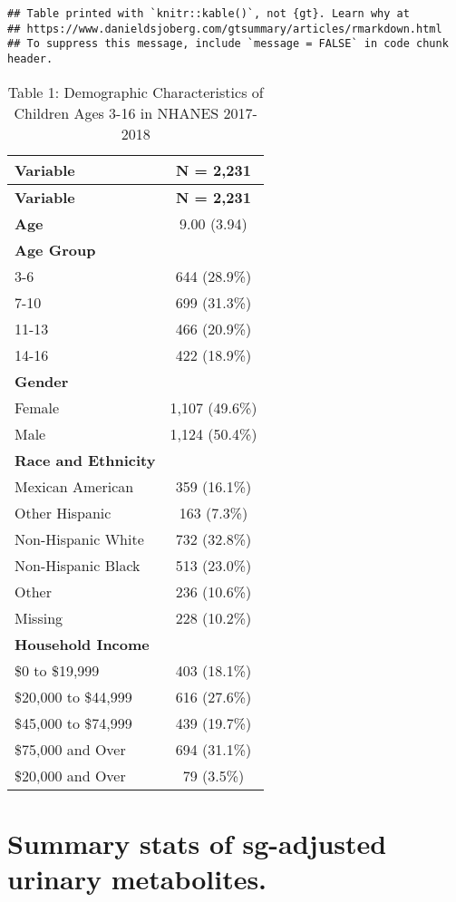 \documentclass[
]{article}
\begin{document}
\begin{verbatim}
## Table printed with `knitr::kable()`, not {gt}. Learn why at
## https://www.danieldsjoberg.com/gtsummary/articles/rmarkdown.html
## To suppress this message, include `message = FALSE` in code chunk header.
\end{verbatim}

\begin{longtable}[]{@{}lc@{}}
\caption{Table 1: Demographic Characteristics of Children Ages 3-16 in
NHANES 2017-2018}\tabularnewline
\toprule\noalign{}
\textbf{Variable} & \textbf{N = 2,231} \\
\midrule\noalign{}
\endfirsthead
\toprule\noalign{}
\textbf{Variable} & \textbf{N = 2,231} \\
\midrule\noalign{}
\endhead
\bottomrule\noalign{}
\endlastfoot
\textbf{Age} & 9.00 (3.94) \\
\textbf{Age Group} & \\
3-6 & 644 (28.9\%) \\
7-10 & 699 (31.3\%) \\
11-13 & 466 (20.9\%) \\
14-16 & 422 (18.9\%) \\
\textbf{Gender} & \\
Female & 1,107 (49.6\%) \\
Male & 1,124 (50.4\%) \\
\textbf{Race and Ethnicity} & \\
Mexican American & 359 (16.1\%) \\
Other Hispanic & 163 (7.3\%) \\
Non-Hispanic White & 732 (32.8\%) \\
Non-Hispanic Black & 513 (23.0\%) \\
Other & 236 (10.6\%) \\
Missing & 228 (10.2\%) \\
\textbf{Household Income} & \\
\$0 to \$19,999 & 403 (18.1\%) \\
\$20,000 to \$44,999 & 616 (27.6\%) \\
\$45,000 to \$74,999 & 439 (19.7\%) \\
\$75,000 and Over & 694 (31.1\%) \\
\$20,000 and Over & 79 (3.5\%) \\
\end{longtable}

\hypertarget{summary-stats-of-sg-adjusted-urinary-metabolites.}{%
\section{Summary stats of sg-adjusted urinary
metabolites.}\label{summary-stats-of-sg-adjusted-urinary-metabolites.}}
\end{document}
